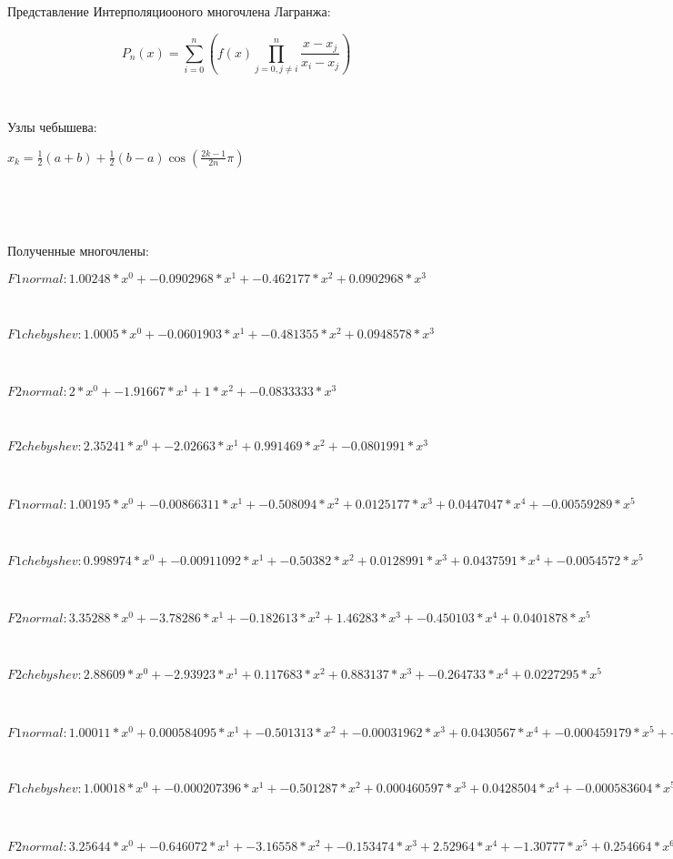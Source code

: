 \documentclass[]{article}
\begin{document}
Представление Интерполяциооного многочлена Лагранжа:

$$P_n(x) = \sum_{i = 0}^n(f(x)\prod_{j=0, j \neq i}^{n}{\frac{x - x_j}{x_i - x_j}})$$

~

Узлы чебышева:

$x_k = \frac{1}{2}(a + b) + \frac{1}{2}(b - a)\cos(\frac{2k - 1}{2n}\pi)$

~

~

Полученные многочлены:


$F1 normal : 1.00248 * x^0 + -0.0902968 * x^1 + -0.462177 * x^2 + 0.0902968*x^3$

~

$F1 chebyshev : 1.0005 * x^0 + -0.0601903 * x^1 + -0.481355 * x^2 + 0.0948578*x^3$

~

$F2 normal : 2 * x^0 + -1.91667 * x^1 + 1 * x^2 + -0.0833333*x^3
$

~

$F2 chebyshev : 2.35241 * x^0 + -2.02663 * x^1 + 0.991469 * x^2 + -0.0801991*x^3
$

~

$F1 normal : 1.00195 * x^0 + -0.00866311 * x^1 + -0.508094 * x^2 + 0.0125177 * x^3 + 0.0447047 * x^4 + -0.00559289*x^5
$

~

$F1 chebyshev : 0.998974 * x^0 + -0.00911092 * x^1 + -0.50382 * x^2 + 0.0128991 * x^3 + 0.0437591 * x^4 + -0.0054572*x^5
$

~

$F2 normal : 3.35288 * x^0 + -3.78286 * x^1 + -0.182613 * x^2 + 1.46283 * x^3 + -0.450103 * x^4 + 0.0401878*x^5
$

~

$F2 chebyshev : 2.88609 * x^0 + -2.93923 * x^1 + 0.117683 * x^2 + 0.883137 * x^3 + -0.264733 * x^4 + 0.0227295*x^5
$

~

$F1 normal : 1.00011 * x^0 + 0.000584095 * x^1 + -0.501313 * x^2 + -0.00031962 * x^3 + 0.0430567 * x^4 + -0.000459179 * x^5 + -0.00159893 * x^6 + 0.000145424*x^7
$

~

$F1 chebyshev : 1.00018 * x^0 + -0.000207396 * x^1 + -0.501287 * x^2 + 0.000460597 * x^3 + 0.0428504 * x^4 + -0.000583604 * x^5 + -0.00154492 * x^6 + 0.000140051*x^7
$

~

$F2 normal : 3.25644 * x^0 + -0.646072 * x^1 + -3.16558 * x^2 + -0.153474 * x^3 + 2.52964 * x^4 + -1.30777 * x^5 + 0.254664 * x^6 + -0.0175113*x^7
$
\end{document}
